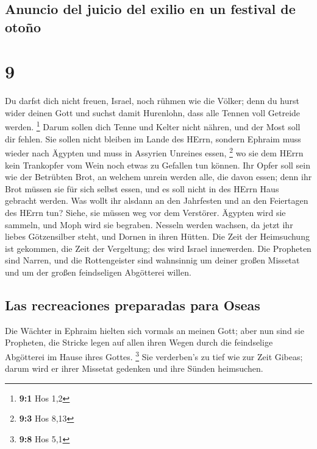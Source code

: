 \hypertarget{anuncio-del-juicio-del-exilio-en-un-festival-de-otouxf1o}{%
\subsection{Anuncio del juicio del exilio en un festival de
otoño}\label{anuncio-del-juicio-del-exilio-en-un-festival-de-otouxf1o}}

\hypertarget{section-8}{%
\section{9}\label{section-8}}

 Du darfst dich nicht freuen, Israel, noch rühmen wie die
Völker; denn du hurst wider deinen Gott und suchst damit Hurenlohn, dass
alle Tennen voll Getreide werden. \footnote{\textbf{9:1} Hos 1,2}
 Darum sollen dich Tenne und Kelter nicht nähren, und der
Most soll dir fehlen.  Sie sollen nicht bleiben im Lande
des HErrn, sondern Ephraim muss wieder nach Ägypten und muss in Assyrien
Unreines essen, \footnote{\textbf{9:3} Hos 8,13}  wo sie
dem HErrn kein Trankopfer vom Wein noch etwas zu Gefallen tun können.
Ihr Opfer soll sein wie der Betrübten Brot, an welchem unrein werden
alle, die davon essen; denn ihr Brot müssen sie für sich selbst essen,
und es soll nicht in des HErrn Haus gebracht werden.  Was
wollt ihr alsdann an den Jahrfesten und an den Feiertagen des HErrn tun?
 Siehe, sie müssen weg vor dem Verstörer. Ägypten wird sie
sammeln, und Moph wird sie begraben. Nesseln werden wachsen, da jetzt
ihr liebes Götzensilber steht, und Dornen in ihren Hütten.
 Die Zeit der Heimsuchung ist gekommen, die Zeit der
Vergeltung; des wird Israel innewerden. Die Propheten sind Narren, und
die Rottengeister sind wahnsinnig um deiner großen Missetat und um der
großen feindseligen Abgötterei willen.

\hypertarget{las-recreaciones-preparadas-para-oseas}{%
\subsection{Las recreaciones preparadas para
Oseas}\label{las-recreaciones-preparadas-para-oseas}}

 Die Wächter in Ephraim hielten sich vormals an meinen
Gott; aber nun sind sie Propheten, die Stricke legen auf allen ihren
Wegen durch die feindselige Abgötterei im Hause ihres Gottes.
\footnote{\textbf{9:8} Hos 5,1}  Sie verderben's zu tief
wie zur Zeit Gibeas; darum wird er ihrer Missetat gedenken und ihre
Sünden heimsuchen.

